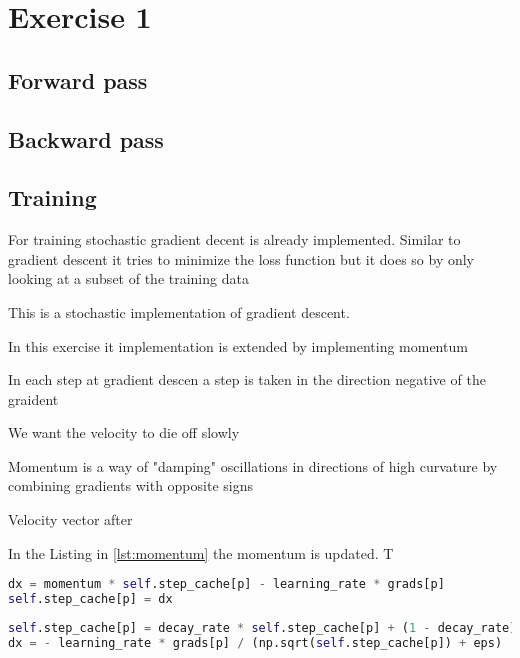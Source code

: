 \chapter{Exercise 1}
\label{chp:e1}
\section{Forward pass}

\section{Backward pass}

\section{Training}
For training stochastic gradient decent is already implemented. Similar to gradient descent it tries to minimize the loss function but it does so by only looking at a subset of the training data

 This is a stochastic implementation of gradient descent. 

In this exercise it implementation is extended by implementing momentum

In each step at gradient descen a step is taken in the direction negative of the graident

We want the velocity to die off slowly 


Momentum is a way of "damping" oscillations in directions of high curvature by combining gradients with opposite signs


Velocity vector      after 

In the Listing in \ref{lst:momentum} the momentum is updated. T
\begin{lstlisting}[language=Python, label=lst:momentum, caption=Momentum update]
dx = momentum * self.step_cache[p] - learning_rate * grads[p] 
self.step_cache[p] = dx 
\end{lstlisting}




\begin{lstlisting}[language=Python, label=lst:RMSprop, caption=RMSProp update]
self.step_cache[p] = decay_rate * self.step_cache[p] + (1 - decay_rate) * grads[p]**2
dx = - learning_rate * grads[p] / (np.sqrt(self.step_cache[p]) + eps)
\end{lstlisting}


    